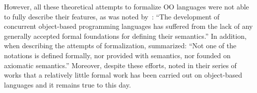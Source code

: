 However, all these theoretical attempts to formalize OO languages
were not able to fully describe their features, as was noted
by~\citet{nierstrasz1991towards}:
``The development of concurrent object-based programming languages
has suffered from the lack of any generally accepted formal
foundations for defining their semantics.'' In addition, when describing the
attempts of formalization, \citet{eden2002visual} summarized: ``Not one of the
notations is defined formally, nor provided with
 semantics,
nor founded on axiomatic semantics.''
%
Moreover, despite these efforts,
\citet{ciaffaglione2003reasoning,ciaffaglione2003typetheories,ciaffaglione2007theory_of_contexts}
noted in their series of works that a relatively little formal work has
been carried out on object-based languages and it remains true to this day.

